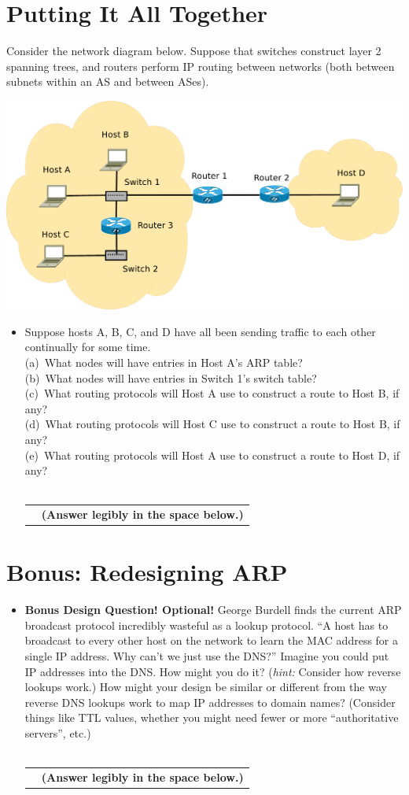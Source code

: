 \documentclass[11pt]{article}
\newcounter{pctr}
\newcommand{\ansbelow}{\probnote{Answer legibly in the space below.}}
\newcommand{\sols}[1]{#1}
\newcommand{\sols}[1]{}
\newcommand\prob[1]%
  {\begin{itemize}\item[]%
   \vspace{.2in}{\bf\thepctr. ~[#1~ points]:}\stepcounter{pctr}}
\newcommand\eprob{\end{itemize}}
\newcommand\probnote[1]%
  {\\\begin{tabular}{cr} \hspace{3in} & {\bf (#1)} \\ \end{tabular}}
\begin{document}
\newpage
\section{Putting It All Together}

Consider the network diagram below.  Suppose that switches construct
layer 2 spanning  trees, and routers perform IP routing between networks
(both between subnets within an AS and between ASes).
\begin{center}
\includegraphics[width=0.65\linewidth]{network}
\end{center}



\prob{12} Suppose hosts A, B, C, and D have
all been sending traffic to each other continually for some time. \\
(a)~What nodes will have entries in Host A's ARP table? \\
(b)~What nodes will have entries in Switch 1's switch table? \\
(c)~What routing protocols will Host A use to construct a route to Host
B, if any? \\
(d)~What routing protocols will Host C use to construct a route to Host
B, if any? \\
(e)~What routing protocols will Host A use to construct a route to Host
D, if any? \\
\ansbelow
\eprob
\vspace*{1.25in}
\sols{
\vspace{-1.25in}

}


\newpage
\section{Bonus: Redesigning ARP}

\prob{5} {\bf Bonus Design Question! Optional!} George Burdell finds the
current ARP broadcast protocol incredibly wasteful as a lookup
protocol. ``A host has to broadcast to every other host on the network
to learn the MAC address for a single IP address. Why can't we just use
the DNS?''  Imagine you could put IP addresses into the DNS.  How might
you do it? ({\em hint:} Consider how reverse lookups work.)  How might
your design be similar or different from the way reverse DNS lookups
work to map IP addresses to domain names? (Consider things like TTL
values, whether you might need fewer or more ``authoritative servers'',
etc.) \\ \ansbelow \eprob
\vspace*{1.25in}
\sols{
\vspace{-1.25in}

}
\end{document}
